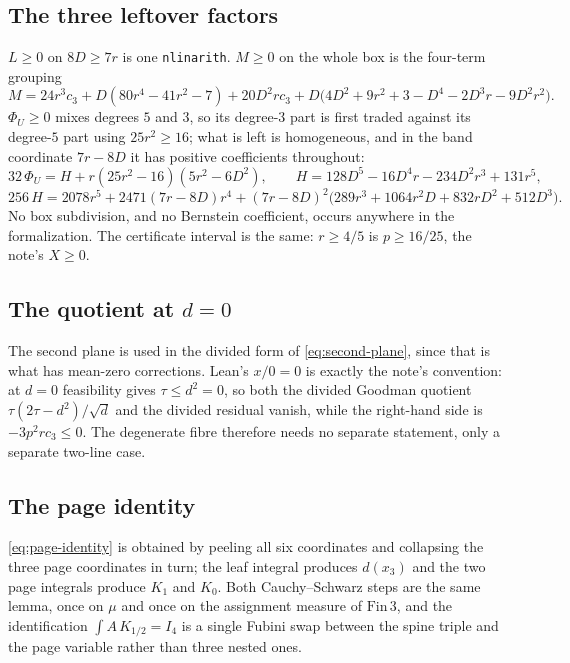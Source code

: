 \documentclass[11pt]{article}
\begin{document}
\subsection{The three leftover factors}

\(L\geq0\) on \(8D\geq7r\) is one \texttt{nlinarith}.  \(M\geq0\) on the whole
box is the four-term grouping
\[
 M=24r^{3}c_3+D(80r^{4}-41r^{2}-7)+20D^{2}rc_3
   +D\bigl(4D^{2}+9r^{2}+3-D^{4}-2D^{3}r-9D^{2}r^{2}\bigr).
\]
\(\Phi_U\geq0\) mixes degrees \(5\) and \(3\), so its degree-\(3\) part is first
traded against its degree-\(5\) part using \(25r^{2}\geq16\); what is left is
homogeneous, and in the band coordinate \(7r-8D\) it has positive coefficients
throughout:
\[
 32\,\Phi_U=H+r(25r^{2}-16)(5r^{2}-6D^{2}),\qquad
 H=128D^{5}-16D^{4}r-234D^{2}r^{3}+131r^{5},
\]
\[
 256\,H=2078r^{5}+2471(7r-8D)r^{4}
 +(7r-8D)^{2}\bigl(289r^{3}+1064r^{2}D+832rD^{2}+512D^{3}\bigr).
\]
No box subdivision, and no Bernstein coefficient, occurs anywhere in the
formalization.  The certificate interval is the same: \(r\geq4/5\) is
\(p\geq16/25\), the note's \(X\geq0\).

\subsection{The quotient at \(d=0\)}

The second plane is used in the divided form of \eqref{eq:second-plane}, since
that is what has mean-zero corrections.  Lean's \(x/0=0\) is exactly the note's
convention: at \(d=0\) feasibility gives \(\tau\leq d^{2}=0\), so both the
divided Goodman quotient \(\tau(2\tau-d^{2})/\sqrt d\) and the divided residual
vanish, while the right-hand side is \(-3p^{2}rc_3\leq0\).  The degenerate
fibre therefore needs no separate statement, only a separate two-line case.

\subsection{The page identity}

\eqref{eq:page-identity} is obtained by peeling all six coordinates and
collapsing the three page coordinates in turn; the leaf integral produces
\(d(x_3)\) and the two page integrals produce \(K_1\) and \(K_0\).  Both
Cauchy--Schwarz steps are the same lemma, once on \(\mu\) and once on the
assignment measure of \(\mathrm{Fin}\,3\), and the identification
\(\int A\,K_{1/2}=I_4\) is a single Fubini swap between the spine triple and
the page variable rather than three nested ones.
\end{document}
